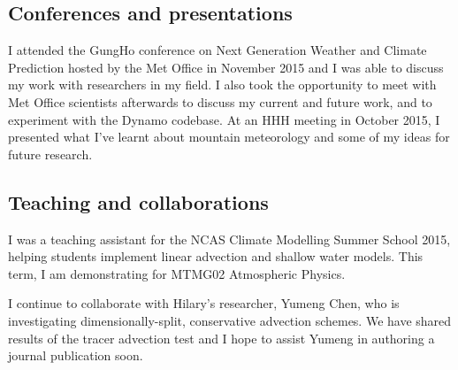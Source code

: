 \documentclass[a4paper]{article}
\begin{document}
\subsection*{Conferences and presentations}
I attended the GungHo conference on Next Generation Weather and Climate Prediction hosted by the Met Office in November 2015 and I was able to discuss my work with researchers in my field.  I also took the opportunity to meet with Met Office scientists afterwards to discuss my current and future work, and to experiment with the Dynamo codebase.  At an HHH meeting in October 2015, I presented what I've learnt about mountain meteorology and some of my ideas for future research.

\subsection*{Teaching and collaborations}
I was a teaching assistant for the NCAS Climate Modelling Summer School 2015, helping students implement linear advection and shallow water models.  This term, I am demonstrating for MTMG02 Atmospheric Physics.

I continue to collaborate with Hilary's researcher, Yumeng Chen, who is investigating dimensionally-split, conservative advection schemes.  We have shared results of the \citet{schaer2002} tracer advection test and I hope to assist Yumeng in authoring a journal publication soon.

                                                 

\end{document}
